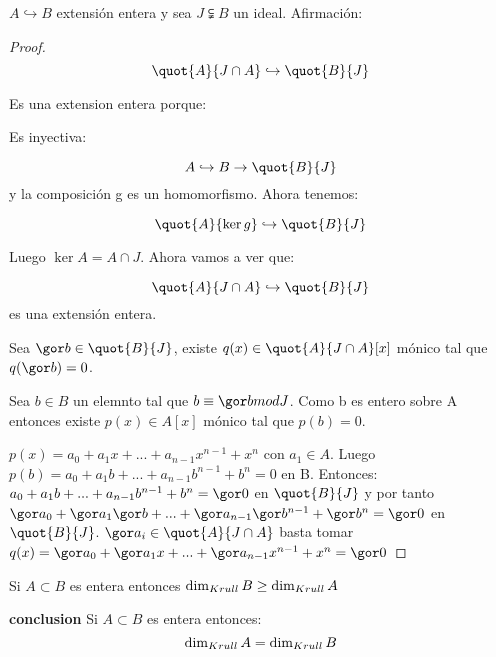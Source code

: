 \obs 		
$A \hookrightarrow B$ extensión entera y sea $J \subsetneqq B$ un ideal. Afirmación:

\begin{proof}
$$\quot{A}{J \cap A} \hookrightarrow \quot{B}{J}$$

Es una extension entera porque:

Es inyectiva:

$$ A \hookrightarrow B \rightarrow \quot{B}{J}$$ y la composición g es un homomorfismo. Ahora tenemos:

$$\quot{A}{\ker g} \hookrightarrow \quot{B}{J}$$

Luego $\ker A=A \cap J$. Ahora vamos a ver que:

$$ \quot{A}{J \cap A} \hookrightarrow \quot{B}{J}$$ es una extensión entera.

Sea $\cls{b} \in \quot{B}{J}$, existe $q(x) \in \quot{A}{J \cap A}[x]$ mónico tal que $q(\cls{b})=0$.


Sea $b \in B$ un elemnto tal que $b \equiv \cls{b} mod J$. Como b es entero sobre A entonces existe $p(x) \in A[x]$ mónico tal que $p(b)=0$.

$p(x) = a_0+a_1x+...+a_{n-1}x^{n-1}+x^n$ con $a_1 \in A$. Luego $p(b) = a_0+a_1b+...+a_{n-1}b^{n-1}+b^n=0$ en B. Entonces: $a_0+a_1b+...+a_{n-1}b^{n-1}+b^n=\cls{0}$ en $\quot{B}{J}$ y por tanto $\cls{a_0}+\cls{a_1}\cls{b}+...+\cls{a_{n-1}}\cls{b^{n-1}}+\cls{b}^n=\cls{0}$  en $\quot{B}{J}$. $\cls{a_i} \in \quot{A}{J \cap A}$ basta tomar $q(x)=\cls{a_0}+\cls{a_1}x+...+\cls{a_{n-1}}x^{n-1}+x^n=\cls{0}$
\end{proof}

\begin{corol}
	Si $A \subset B$ es entera entonces $\dim_{Krull} B \geq \dim_{Krull} A$
\end{corol}

\textbf{conclusion} Si $A \subset B$ es entera entonces:
$$ \dim_{Krull} A = \dim_{Krull} B $$

